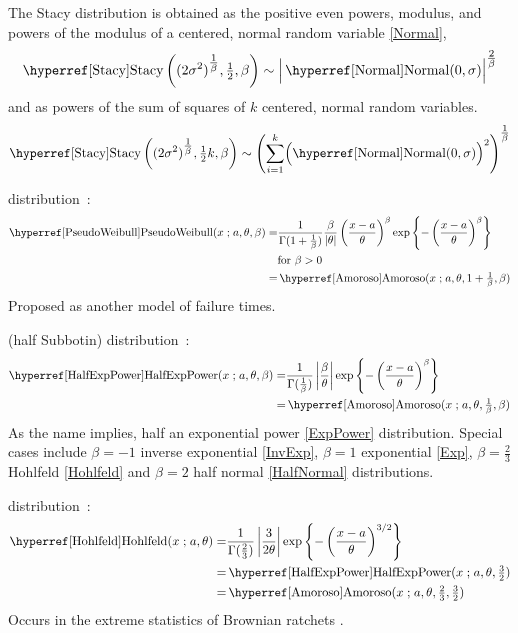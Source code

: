 The Stacy distribution is obtained as the positive even powers,  modulus, and powers of the modulus of a centered, normal random variable \eqref{Normal}, 
\[
\opr{Stacy}\left((2\sigma^2)^{\tfrac{1}{\beta}} ,\tfrac{1}{2}, \beta\right) \sim \Big|\opr{Normal}(0,\sigma)\Big|^{\tfrac{2}{\beta}}
\notag
\checked
\]
and as powers of the sum of squares of $k$ centered, normal random variables. 
\[
\opr{Stacy}\left( (2\sigma^2)^{\tfrac{1}{\beta}} ,\tfrac{1}{2}k, \beta\right) \sim  \left( \sum_{i=1}^{k} \Bigl(\opr{Normal}(0,\sigma)\Bigr)^2\right)^{\tfrac{1}{\beta}}
\notag
\checked
\]



 distribution~\cite{Voda1989}:
\begin{align}
\label{PseudoWeibull}
\opr{PseudoWeibull}(x\given a, \theta,\beta)  
=& \frac{1}{\Gamma(1+\tfrac{1}{\beta})} \frac{\beta}{|\theta|} \left(\frac{x-a}{\theta}\right)^{\beta} 
\exp \left\{ -\left(\frac{x-a}{\theta}\right)^{\beta} \right\} \checked
\\ & \text{for } \beta>0 \notag 
\\=&  \opr{Amoroso}(x\given  a, \theta, 1+\tfrac{1}{\beta}, \beta) \notag \checked
\end{align}
Proposed as another model of failure times. 

 (half Subbotin) distribution~\cite{Gui2013}:
\begin{align}
\label{HalfExpPower}
\opr{HalfExpPower}(x\given a, \theta,\beta)
=& 
\frac{1}{\Gamma(\tfrac{1}{\beta})} 
\left|\frac{\beta}{\theta}\right|
\exp \left\{
-  \left(\frac{x-a}{\theta}\right)^{\beta}
\right\} \checked
\\=&  \opr{Amoroso}(x\given  a, \theta,\tfrac{1}{\beta}, \beta) \notag \checked
\end{align}
As the name implies, half an exponential power \eqref{ExpPower} distribution. Special cases include $\beta=-1$ inverse exponential  \eqref{InvExp}, $\beta=1$ exponential \eqref{Exp}, $\beta=\tfrac{2}{3}$ Hohlfeld  \eqref{Hohlfeld}  and $\beta=2$ half normal \eqref{HalfNormal} distributions. 

 distribution~\cite{Hohlfeld2014}:
\begin{align}
\label{Hohlfeld}
\opr{Hohlfeld}(x\given a, \theta)
=& 
\frac{1}{\Gamma(\tfrac{2}{3})} 
\left|\frac{3}{2\theta}\right|
\exp \left\{
-  \left(\frac{x-a}{\theta}\right)^{3/2}
\right\} \checked
\\=&  \opr{HalfExpPower}(x\given a, \theta,\tfrac{3}{2}) \notag \checked
\\=&  \opr{Amoroso}(x\given  a, \theta,\tfrac{2}{3}, \tfrac{3}{2}) \notag \checked
\end{align}
Occurs in the extreme statistics of Brownian ratchets  \cite[Suppl. p.5]{Hohlfeld2014}.





